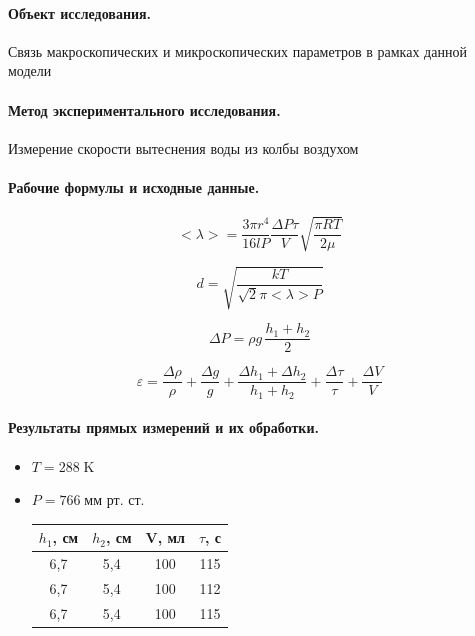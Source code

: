 \documentclass{article}
\begin{document}
\paragraph{Объект исследования.}
Связь макроскопических и микроскопических параметров в рамках данной модели

\paragraph{Метод экспериментального исследования.}
Измерение скорости вытеснения воды из колбы воздухом

 \paragraph{Рабочие формулы и исходные данные.}\hypertarget{formuls}{}
 \begin{equation}
 	<\lambda>=\frac{3\pi r^4}{16lP} \frac{\Delta P\tau}{V} \sqrt{\frac{\pi RT}{2\mu}}
 \end{equation}

\begin{equation}
	d=\sqrt{\frac{kT}{\sqrt{2}\pi <\lambda>P}}
\end{equation}

\begin{equation}
	\Delta P=\rho g\, \frac{h_1+h_2}{2}
\end{equation}

\begin{equation}
	\varepsilon=\frac{\Delta \rho}{\rho}+\frac{\Delta g}{g}+\frac{\Delta h_1+\Delta h_2}{h_1+h_2}+\frac{\Delta \tau}{\tau}+\frac{\Delta V}{V}
\end{equation}

\paragraph{Результаты прямых измерений и их обработки.}
\begin{itemize}
	\item $T=288\;\mbox{K}$
	\item$P=766\;\mbox{мм рт. ст.}$
	\begin{table}[htb]
	\begin{tabular}{c|c|c|c}
		$h_1$,  см & $h_2$,  см & V,  мл & $\tau$,  с \\
		\hline
		6,7 & 5,4 & 100 & 115 \\
	
		6,7 & 5,4 & 100 & 112 \\
	
		6,7 & 5,4 & 100 & 115 \\
	\end{tabular}
\end{table}
\end{itemize}
\end{document}
